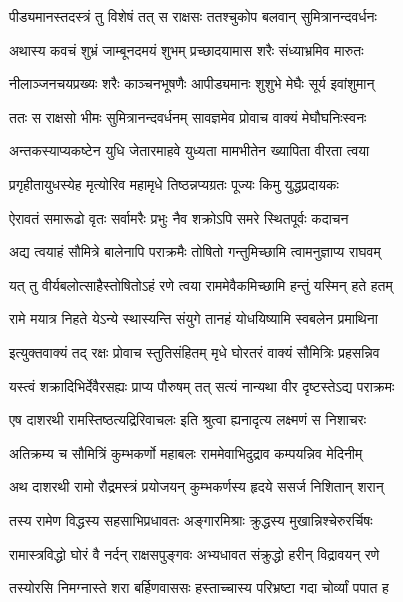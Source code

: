 \twolineshloka
{पीड्यमानस्तदस्त्रं तु विशेषं तत् स राक्षसः}
{ततश्चुकोप बलवान् सुमित्रानन्दवर्धनः} %

\twolineshloka
{अथास्य कवचं शुभ्रं जाम्बूनदमयं शुभम्}
{प्रच्छादयामास शरैः संध्याभ्रमिव मारुतः} %

\twolineshloka
{नीलाञ्जनचयप्रख्यः शरैः काञ्चनभूषणैः}
{आपीड्यमानः शुशुभे मेघैः सूर्य इवांशुमान्} %

\twolineshloka
{ततः स राक्षसो भीमः सुमित्रानन्दवर्धनम्}
{सावज्ञमेव प्रोवाच वाक्यं मेघौघनिःस्वनः} %

\twolineshloka
{अन्तकस्याप्यकष्टेन युधि जेतारमाहवे}
{युध्यता मामभीतेन ख्यापिता वीरता त्वया} %

\twolineshloka
{प्रगृहीतायुधस्येह मृत्योरिव महामृधे}
{तिष्ठन्नप्यग्रतः पूज्यः किमु युद्धप्रदायकः} %

\twolineshloka
{ऐरावतं समारूढो वृतः सर्वामरैः प्रभुः}
{नैव शक्रोऽपि समरे स्थितपूर्वः कदाचन} %

\twolineshloka
{अद्य त्वयाहं सौमित्रे बालेनापि पराक्रमैः}
{तोषितो गन्तुमिच्छामि त्वामनुज्ञाप्य राघवम्} %

\twolineshloka
{यत् तु वीर्यबलोत्साहैस्तोषितोऽहं रणे त्वया}
{राममेवैकमिच्छामि हन्तुं यस्मिन् हते हतम्} %

\twolineshloka
{रामे मयात्र निहते येऽन्ये स्थास्यन्ति संयुगे}
{तानहं योधयिष्यामि स्वबलेन प्रमाथिना} %

\twolineshloka
{इत्युक्तवाक्यं तद् रक्षः प्रोवाच स्तुतिसंहितम्}
{मृधे घोरतरं वाक्यं सौमित्रिः प्रहसन्निव} %

\twolineshloka
{यस्त्वं शक्रादिभिर्देवैरसह्यः प्राप्य पौरुषम्}
{तत् सत्यं नान्यथा वीर दृष्टस्तेऽद्य पराक्रमः} %

\twolineshloka
{एष दाशरथी रामस्तिष्ठत्यद्रिरिवाचलः}
{इति श्रुत्वा ह्यनादृत्य लक्ष्मणं स निशाचरः} %

\twolineshloka
{अतिक्रम्य च सौमित्रिं कुम्भकर्णो महाबलः}
{राममेवाभिदुद्राव कम्पयन्निव मेदिनीम्} %

\twolineshloka
{अथ दाशरथी रामो रौद्रमस्त्रं प्रयोजयन्}
{कुम्भकर्णस्य हृदये ससर्ज निशितान् शरान्} %

\twolineshloka
{तस्य रामेण विद्धस्य सहसाभिप्रधावतः}
{अङ्गारमिश्राः क्रुद्धस्य मुखान्निश्चेरुरर्चिषः} %

\twolineshloka
{रामास्त्रविद्धो घोरं वै नर्दन् राक्षसपुङ्गवः}
{अभ्यधावत संक्रुद्धो हरीन् विद्रावयन् रणे} %

\twolineshloka
{तस्योरसि निमग्नास्ते शरा बर्हिणवाससः}
{हस्ताच्चास्य परिभ्रष्टा गदा चोर्व्यां पपात ह} %

